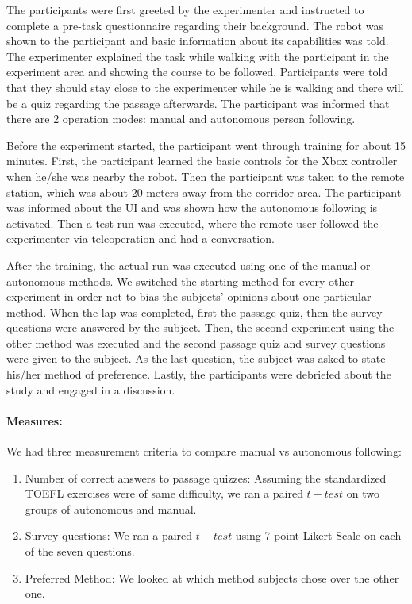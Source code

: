 The participants were first greeted by the experimenter and instructed to complete a pre-task questionnaire regarding their background. The robot was shown to the participant and basic information about its capabilities was told. The experimenter explained the task while walking with the participant in the experiment area and showing the course to be followed. Participants were told that they should stay close to the experimenter while he is walking and there will be a quiz regarding the passage afterwards. The participant was informed that there are 2 operation modes: manual and autonomous person following.

Before the experiment started, the participant went through training for about 15 minutes. First, the participant learned the basic controls for the Xbox controller when he/she was nearby the robot. Then the participant was taken to the remote station, which was about 20 meters away from the corridor area. The participant was informed about the UI and was shown how the autonomous following is activated. Then a test run was executed, where the remote user followed the experimenter via teleoperation and had a conversation.

After the training, the actual run was executed using one of the manual or autonomous methods. We switched the starting method for every other experiment in order not to bias the subjects' opinions about one particular method. When the lap was completed, first the passage quiz, then the survey questions were answered by the subject. Then, the second experiment using the other method was executed and the second passage quiz and survey questions were given to the subject. As the last question, the subject was asked to state his/her method of preference. Lastly, the participants were debriefed about the study and engaged in a discussion. 

\paragraph{Measures:}
We had three measurement criteria to compare manual vs autonomous following: 

\begin{enumerate}
\item  Number of correct answers to passage quizzes: Assuming the standardized TOEFL exercises were of same difficulty, we ran a paired $t-test$ on two groups of autonomous and manual.
\item Survey questions: We ran a paired $t-test$ using 7-point Likert Scale on each of the seven questions.
\item Preferred Method: We looked at which method subjects chose over the other one.
\end{enumerate}

